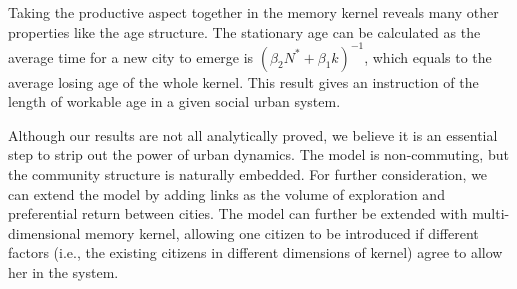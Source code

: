 \documentclass[reprint,unsortedaddress,amsmath,amssymb,aps,prl,showkeys]{revtex4-2}
\begin{document}
Taking the productive aspect together in the memory kernel reveals many other properties like the age structure. The stationary age can be calculated as the average time for a new city to emerge is $(\beta_2 N^* + \beta_1 k)^{-1}$, which equals to the average losing age of the whole kernel. This result gives an instruction of the length of workable age in a given social urban system.

Although our results are not all analytically proved, we believe it is an essential step to strip out the power of urban dynamics. The model is non-commuting, but the community structure is naturally embedded. For further consideration, we can extend the model by adding links as the volume of exploration and preferential return between cities\cite{WANG2019121921}. The model can further be extended with multi-dimensional memory kernel, allowing one citizen to be introduced if different factors\cite{tokita2020social} (i.e., the existing citizens in different dimensions of kernel) agree to allow her in the system.




\end{document}
